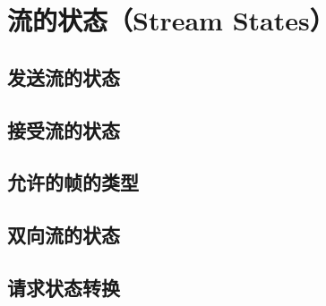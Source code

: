 \section{流的状态（Stream States）}
\subsection{发送流的状态}
\subsection{接受流的状态}
\subsection{允许的帧的类型}
\subsection{双向流的状态}
\subsection{请求状态转换}